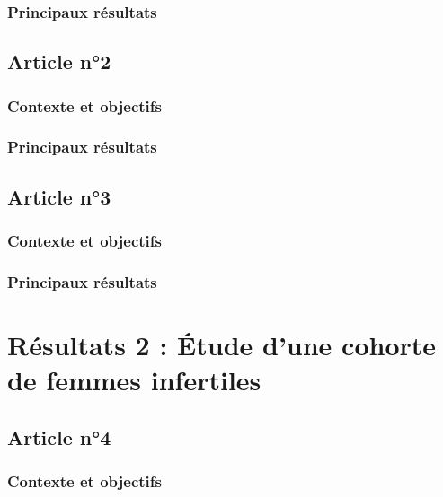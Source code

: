 \documentclass[12pt,twoside]{ugathesis}
\begin{document}
\subsubsection{Principaux résultats}\label{principaux-resultats}

\subsection{Article n°2}\label{article-n2}

\subsubsection{Contexte et objectifs}\label{contexte-et-objectifs-1}

\subsubsection{Principaux résultats}\label{principaux-resultats-1}

\subsection{Article n°3}\label{article-n3}

\subsubsection{Contexte et objectifs}\label{contexte-et-objectifs-2}

\subsubsection{Principaux résultats}\label{principaux-resultats-2}

\section{Résultats 2 : Étude d'une cohorte de femmes
infertiles}\label{resultats-2-etude-dune-cohorte-de-femmes-infertiles}

\subsection{Article n°4}\label{article-n4}

\subsubsection{Contexte et objectifs}\label{contexte-et-objectifs-3}
\end{document}
